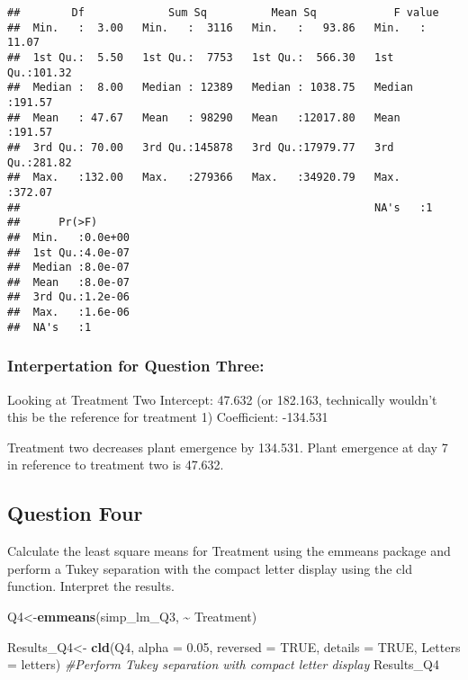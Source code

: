 \documentclass[
  12pt,
]{article}
\newenvironment{Shaded}{\begin{snugshade}}{\end{snugshade}}
\newcommand{\AttributeTok}[1]{\textcolor[rgb]{0.13,0.29,0.53}{#1}}
\newcommand{\CommentTok}[1]{\textcolor[rgb]{0.56,0.35,0.01}{\textit{#1}}}
\newcommand{\ConstantTok}[1]{\textcolor[rgb]{0.56,0.35,0.01}{#1}}
\newcommand{\FloatTok}[1]{\textcolor[rgb]{0.00,0.00,0.81}{#1}}
\newcommand{\FunctionTok}[1]{\textcolor[rgb]{0.13,0.29,0.53}{\textbf{#1}}}
\newcommand{\NormalTok}[1]{#1}
\newcommand{\OtherTok}[1]{\textcolor[rgb]{0.56,0.35,0.01}{#1}}
\newcommand{\SpecialCharTok}[1]{\textcolor[rgb]{0.81,0.36,0.00}{\textbf{#1}}}
\begin{document}
\begin{verbatim}
##        Df             Sum Sq          Mean Sq            F value      
##  Min.   :  3.00   Min.   :  3116   Min.   :   93.86   Min.   : 11.07  
##  1st Qu.:  5.50   1st Qu.:  7753   1st Qu.:  566.30   1st Qu.:101.32  
##  Median :  8.00   Median : 12389   Median : 1038.75   Median :191.57  
##  Mean   : 47.67   Mean   : 98290   Mean   :12017.80   Mean   :191.57  
##  3rd Qu.: 70.00   3rd Qu.:145878   3rd Qu.:17979.77   3rd Qu.:281.82  
##  Max.   :132.00   Max.   :279366   Max.   :34920.79   Max.   :372.07  
##                                                       NA's   :1       
##      Pr(>F)       
##  Min.   :0.0e+00  
##  1st Qu.:4.0e-07  
##  Median :8.0e-07  
##  Mean   :8.0e-07  
##  3rd Qu.:1.2e-06  
##  Max.   :1.6e-06  
##  NA's   :1
\end{verbatim}

\subsubsection{Interpertation for Question
Three:}\label{interpertation-for-question-three}

Looking at Treatment Two Intercept: 47.632 (or 182.163, technically
wouldn't this be the reference for treatment 1) Coefficient: -134.531

Treatment two decreases plant emergence by 134.531. Plant emergence at
day 7 in reference to treatment two is 47.632.

\subsection{Question Four}\label{question-four}

Calculate the least square means for Treatment using the emmeans package
and perform a Tukey separation with the compact letter display using the
cld function. Interpret the results.

\begin{Shaded}
\begin{Highlighting}[]
\NormalTok{Q4}\OtherTok{\textless{}{-}}\FunctionTok{emmeans}\NormalTok{(simp\_lm\_Q3, }\SpecialCharTok{\textasciitilde{}}\NormalTok{ Treatment) }
                    
\NormalTok{Results\_Q4}\OtherTok{\textless{}{-}} \FunctionTok{cld}\NormalTok{(Q4, }\AttributeTok{alpha =} \FloatTok{0.05}\NormalTok{, }\AttributeTok{reversed =} \ConstantTok{TRUE}\NormalTok{, }\AttributeTok{details =} \ConstantTok{TRUE}\NormalTok{, }
                 \AttributeTok{Letters =}\NormalTok{ letters)  }
                        \CommentTok{\#Perform Tukey separation with compact letter display}
\NormalTok{Results\_Q4}
\end{Highlighting}
\end{Shaded}
\end{document}
